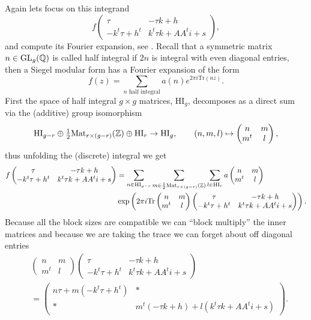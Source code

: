 Again lets focus on this integrand \[f\begin{pmatrix} \tau & -\tau k + h\\ -k^t \tau + h^t & k^t \tau k + A A^t i + s \end{pmatrix},\] and compute its Fourier expansion, see \cite[3.4]{bruinier123ModularForms2008}. Recall that a symmetric matrix \(n\in \GL_g(\Q)\) is called half integral if \(2n\) is integral with even diagonal entries, then a Siegel modular form has a Fourier expansion of the form
\[f(z) = \sum_{n \text{ half integral}}a(n) e^{2\pi i \mathrm{Tr}(nz)} .\]
First the space of half integral \(g\times g\) matrices, \(\mathrm{HI}_g\), decomposes as a direct sum via the (additive) group isomorphism
\[ \mathrm{HI}_{g-r} \oplus \tfrac{ 1}{ 2} \mathrm{Mat}_{ r\times (g-r)}(\Z) \oplus \mathrm{HI}_{r}\to\mathrm{HI}_g, \qquad (n, m, l)\mapsto \begin{pmatrix} n & m\\ m^t & l \end{pmatrix}, \]
thus unfolding the (discrete) integral we get 
\begin{align*}
	f\begin{pmatrix} \tau & -\tau k + h\\ -k^t \tau + h^t & k^t \tau k + A A^t i + s \end{pmatrix} &=   \sum_{n\in\mathrm{HI}_{g-r}} \sum_{m\in\frac{1}{2} \mathrm{Mat}_{ r\times (g-r)}(\Z)} \sum_{l\in\mathrm{HI}_{r}} a\begin{pmatrix} n & m\\ m^t & l \end{pmatrix} \\
	&\exp \left(2\pi i \mathrm{Tr} \begin{pmatrix} n & m\\ m^t & l \end{pmatrix}\begin{pmatrix} \tau & -\tau k + h\\ -k^t \tau + h^t & k^t \tau k + A A^t i + s \end{pmatrix} \right) . \\
\end{align*}
Because all the block sizes are compatible we can ``block multiply'' the inner matrices and because we are taking the trace we can forget about off diagonal entries
\begin{align*}
	&\begin{pmatrix} n & m\\ m^t & l \end{pmatrix}\begin{pmatrix} \tau & -\tau k + h\\ -k^t \tau + h^t & k^t \tau k + A A^t i + s \end{pmatrix}\\ &= 
	\begin{pmatrix} n\tau + m(-k^t \tau + h^t ) & \ast\\ \ast & m^t(-\tau k + h) + l( k^t \tau k + A A^t i + s) \end{pmatrix}.
\end{align*}
